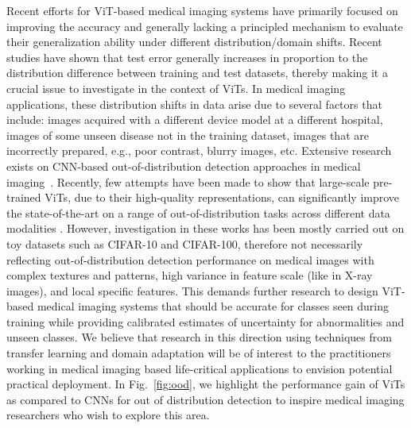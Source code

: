 \documentclass[10pt,journal,compsoc]{IEEEtran}
\begin{document}
Recent efforts for ViT-based medical imaging systems have primarily focused on improving the accuracy and generally lacking a principled mechanism to evaluate their generalization ability under  %
different distribution/domain shifts.
Recent studies have shown that test error
generally increases in proportion to the distribution difference between training and test datasets, thereby making it a crucial issue to investigate in the context of ViTs.
In medical imaging applications, these distribution shifts in data arise due to several factors that include: images acquired with a different device model at a different hospital, images of some unseen disease not in the training dataset, images that are incorrectly prepared, e.g., poor contrast, blurry images, etc. Extensive research exists on CNN-based out-of-distribution detection approaches in medical imaging~\cite{yang2021generalized,zhang2021out,zhang2021delving,linmans2020efficient,hendrycks2016baseline}. 
Recently, few attempts have been made to show that large-scale pre-trained ViTs, due to their high-quality representations, can significantly improve the state-of-the-art on a range of out-of-distribution tasks across different data modalities  \cite{fort2021exploring,koner2021oodformer,radford2021learning}. However, investigation in these works has been mostly carried out on toy datasets such as CIFAR-10 and CIFAR-100, therefore not necessarily reflecting out-of-distribution detection performance on medical images with complex textures and patterns, high variance in feature scale (like in X-ray images), and local specific features. This demands further research to design ViT-based medical imaging systems that should be accurate for classes seen during training while providing calibrated estimates of uncertainty for abnormalities and unseen classes. We believe that research in this direction using techniques from transfer learning and domain adaptation will be of interest to the practitioners working in medical imaging based life-critical applications to envision potential practical deployment. In Fig.~\ref{fig:ood}, we highlight the performance gain of ViTs as compared to CNNs for out of distribution detection to inspire medical imaging researchers who wish to explore this area.
\end{document}
